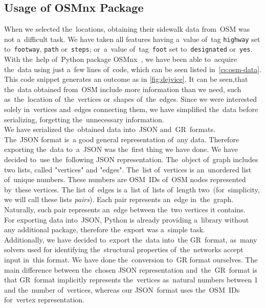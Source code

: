 \subsection{Usage of OSMnx Package}
When we selected the~locations, obtaining their sidewalk data from~OSM was not a~difficult task. We have taken all features having a~value of~tag \texttt{highway} set to~\texttt{footway}, \texttt{path} or~\texttt{steps}; or~a~value of~tag~\texttt{foot} set to~\texttt{designated} or~\texttt{yes}. \\
With the~help of~Python package OSMnx~\cite{osmnx}, we have been able to~acquire the~data using just a~few lines of~code, which can be seen listed in~\autoref{cs:osm-data}.\\
This code snippet generates an outcome as in \autoref{fig:dejvice}.
It can be seen,that the~data obtained from~OSM include more information than we need, such as~the~location of~the~vertices or~shapes of~the~edges. Since we were interested solely in~vertices and~edges connecting them, we have simplified the~data before serializing, forgetting the~unnecessary information. \\
We have serialized the~obtained data into~JSON and~GR~formats. \\
The~JSON format is~a good general representation of~any data. Therefore exporting the~data to~a~JSON was the~first thing we have done. We have decided to~use the~following JSON representation. The~object of~graph includes two lists, called "vertices" and "edges". The~list of~vertices is an~unordered list of~unique numbers. These numbers are OSM~IDs of~OSM nodes represented by~these vertices. The list of~edges is a~list of~lists of~length two~(for~simplicity, we will call these lists \textit{pairs}). Each pair represents an~edge in~the~graph. Naturally, such pair represents an~edge between the~two vertices it contains. \\
For exporting data into~JSON, Python is already providing a~library without any additional package, therefore the~export was a~simple task. \\
Additionally, we have decided to~export the~data into~the GR~format, as~many solvers used for identifying the~structural properties of~the~networks accept input in~this format. We have done the~conversion to~GR format ourselves. The main difference between the~chosen JSON representation and~the~GR~format is that GR~format implicitly represents the~vertices as~natural numbers between 1 and the~number of~vertices, whereas our JSON~format uses the~OSM~IDs for~vertex representation.
